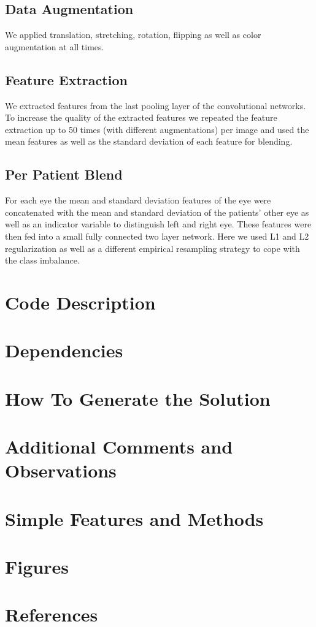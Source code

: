 \documentclass[12pt,a4paper]{scrartcl}
\begin{document}
\subsection{Data Augmentation}
We applied translation, stretching, rotation, flipping as well as color augmentation at all times.
\subsection{Feature Extraction}
We extracted features from the last pooling layer of the convolutional networks. To increase the quality of the extracted features we repeated the feature extraction up to 50 times (with different augmentations) per image and used the mean features as well as the standard deviation of each feature for blending.
\subsection{Per Patient Blend}
For each eye the mean and standard deviation features of the eye were concatenated with the mean and standard deviation of the patients' other eye as well as an indicator variable to distinguish left and right eye. These features were then fed into a small fully connected two layer network. Here we used L1 and L2 regularization as well as a different empirical resampling strategy to cope with the class imbalance.
\section{Code Description}
\section{Dependencies}
\section{How To Generate the Solution}
\section{Additional Comments and Observations}
\section{Simple Features and Methods}
\section{Figures}
\section{References}
\end{document}
